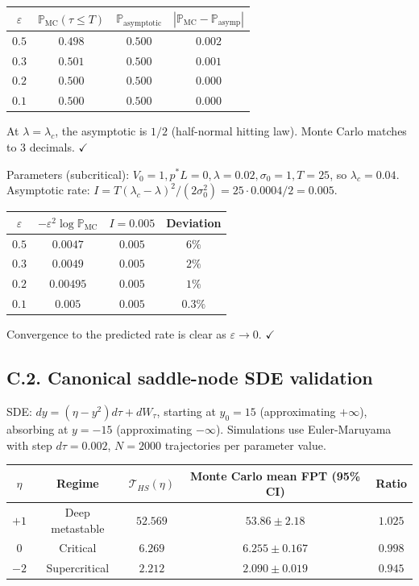 \documentclass[11pt,a4paper]{article}
\theoremstyle{plain}
\theoremstyle{definition}
\renewcommand{\P}{\mathbb{P}}
\newcommand{\eps}{\varepsilon}
\begin{document}
\begin{center}
\begin{tabular}{cccc}
\toprule
$\eps$ & $\P_{\text{MC}}(\tau \leq T)$ & $\P_{\text{asymptotic}}$ & $|\P_{\text{MC}} - \P_{\text{asymp}}|$ \\
\midrule
$0.5$ & $0.498$ & $0.500$ & $0.002$ \\
$0.3$ & $0.501$ & $0.500$ & $0.001$ \\
$0.2$ & $0.500$ & $0.500$ & $0.000$ \\
$0.1$ & $0.500$ & $0.500$ & $0.000$ \\
\bottomrule
\end{tabular}
\end{center}
At $\lambda = \lambda_c$, the asymptotic is $1/2$ (half-normal hitting law). Monte Carlo matches to 3 decimals. $\checkmark$

Parameters (subcritical): $V_0 = 1, p^*L = 0, \lambda = 0.02, \sigma_0 = 1, T = 25$, so $\lambda_c = 0.04$. Asymptotic rate: $I = T(\lambda_c-\lambda)^2/(2\sigma_0^2) = 25\cdot 0.0004/2 = 0.005$.

\begin{center}
\begin{tabular}{cccc}
\toprule
$\eps$ & $-\eps^2 \log\P_{\text{MC}}$ & $I = 0.005$ & Deviation \\
\midrule
$0.5$ & $0.0047$ & $0.005$ & $6\%$ \\
$0.3$ & $0.0049$ & $0.005$ & $2\%$ \\
$0.2$ & $0.00495$ & $0.005$ & $1\%$ \\
$0.1$ & $0.005$ & $0.005$ & $0.3\%$ \\
\bottomrule
\end{tabular}
\end{center}
Convergence to the predicted rate is clear as $\eps \to 0$. $\checkmark$

\subsection*{C.2. Canonical saddle-node SDE validation}

SDE: $dy = (\eta - y^2)d\tau + dW_\tau$, starting at $y_0 = 15$ (approximating $+\infty$), absorbing at $y = -15$ (approximating $-\infty$). Simulations use Euler-Maruyama with step $d\tau = 0.002$, $N = 2000$ trajectories per parameter value.

\begin{center}
\begin{tabular}{ccccc}
\toprule
$\eta$ & Regime & $\mathcal T_{HS}(\eta)$ & Monte Carlo mean FPT (95\% CI) & Ratio \\
\midrule
$+1$ & Deep metastable & $52.569$ & $53.86 \pm 2.18$ & $1.025$ \\
$0$ & Critical & $6.269$ & $6.255 \pm 0.167$ & $0.998$ \\
$-2$ & Supercritical & $2.212$ & $2.090 \pm 0.019$ & $0.945$ \\
\bottomrule
\end{tabular}
\end{center}
\end{document}
